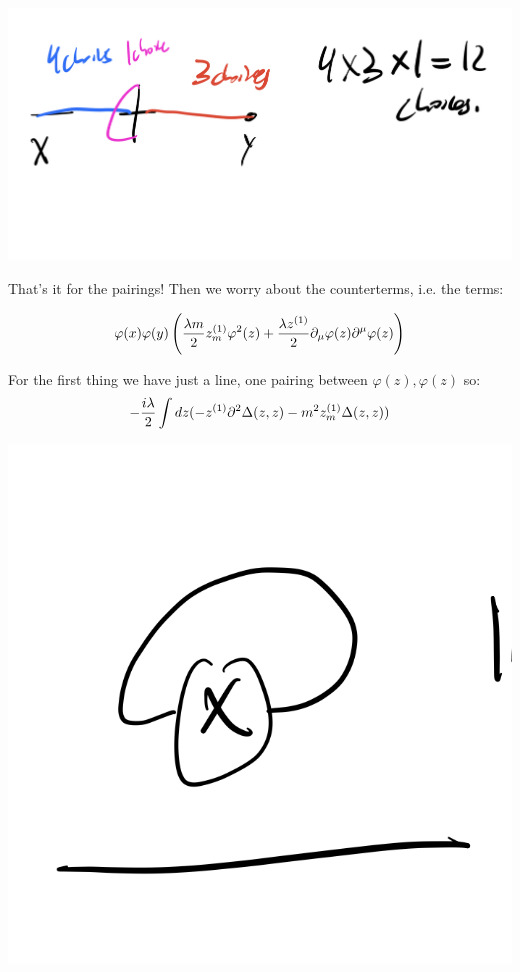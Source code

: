 \begin{center}
   \includegraphics[scale=0.5]{Images/fig-firstorderpairing2.png}
\end{center}

That's it for the pairings! Then we worry about the counterterms, i.e. the terms:

\begin{equation}
   \varphi(x)\varphi(y)\left(\frac{\lambda m}{2}z^{(1)}_m \varphi^2(z) + \frac{\lambda z^{(1)}}{2}\p_\mu \varphi(z)\p^\mu \varphi(z)\right)
\end{equation}

For the first thing we have just a line, one pairing between $\varphi(z), \varphi(z)$ so:
\begin{equation}
   -\frac{i\lambda}{2}\int dz(-z^{(1)} \partial^2 \Delta(z, z) - m^2z_m^{(1)}\Delta(z, z))
\end{equation}

\begin{center}
   \includegraphics[scale=0.5]{Images/fig-firstordercounterterm1.png}
\end{center}

